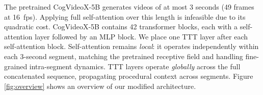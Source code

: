 \documentclass[runningheads]{llncs}
\begin{document}
The pretrained CogVideoX-5B generates videos of at most 3 seconds (49 frames at 16~fps). Applying full self-attention over this length is infeasible due to its quadratic cost. CogVideoX-5B contains 42 transformer blocks, each with a self-attention layer followed by an MLP block. We place one TTT layer after each self-attention block. Self-attention remains \textit{local}: it operates independently within each 3-second segment, matching the pretrained receptive field and handling fine-grained intra-segment dynamics. TTT layers operate \textit{globally} across the full concatenated sequence, propagating procedural context across segments. Figure \ref{fig:overview} shows an overview of our modified architecture.
\end{document}
